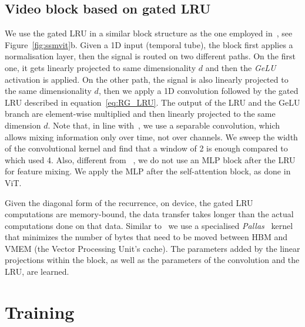 \subsection{Video block based on gated LRU}

We use the gated LRU in a similar block structure as the one employed in~\cite{de2024griffinmixinggatedlinear}, see Figure~\ref{fig:ssmvit}b. 
Given a 1D input (temporal tube), the block first applies a normalisation layer, then the signal is routed on two different paths. On the first one, it gets linearly projected to same dimensionality $d$  and then the \emph{GeLU} activation is applied. On the other path, the signal is also linearly projected to the same dimensionality $d$, then we apply a 1D convolution followed by the gated LRU described in equation~\eqref{eq:RG_LRU}. The output of the LRU and the GeLU branch are element-wise multiplied and then linearly projected to the same dimension $d$. Note that, in line with~\cite{de2024griffinmixinggatedlinear}, we use a separable convolution, which allows mixing information only over time, not over channels. We sweep the width of the convolutional kernel and find that a window of 2 is enough compared to~\cite{de2024griffinmixinggatedlinear} which used 4. Also, different from ~\cite{de2024griffinmixinggatedlinear}, we do not use an MLP block after the LRU for feature mixing. We apply the MLP after the self-attention block, as done in ViT. 

Given the diagonal form of the recurrence, on device, the gated LRU computations are memory-bound, \ie the data transfer takes longer than the actual computations done on that data. Similar to~\cite{de2024griffinmixinggatedlinear} we use a specialised \emph{Pallas}~\cite{jax2018github} kernel that minimizes the number of bytes that need to be moved between HBM and VMEM (the Vector Processing Unit's cache). The parameters added by the linear projections within the block, as well as the parameters of the convolution and the LRU, are learned.


\section{Training \ssm}
\label{sec:training}

